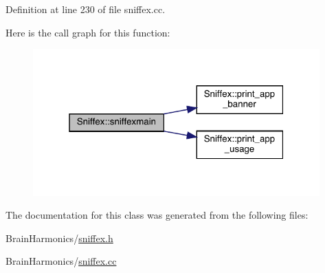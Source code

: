 Definition at line 230 of file sniffex.\+cc.

Here is the call graph for this function\+:\nopagebreak
\begin{figure}[H]
\begin{center}
\leavevmode
\includegraphics[width=313pt]{class_sniffex_a41e146d588c285c94c0beee223d8552b_cgraph}
\end{center}
\end{figure}


The documentation for this class was generated from the following files\+:\begin{DoxyCompactItemize}
\item 
Brain\+Harmonics/\mbox{\hyperlink{sniffex_8h}{sniffex.\+h}}\item 
Brain\+Harmonics/\mbox{\hyperlink{sniffex_8cc}{sniffex.\+cc}}\end{DoxyCompactItemize}
